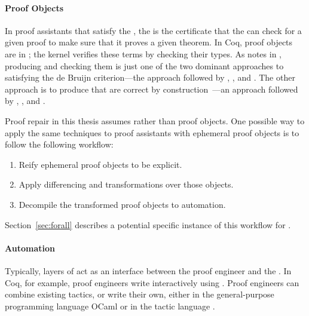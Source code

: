 \paragraph{Proof Objects} 
In proof assistants that satisfy the , the  is the certificate that the  can check for
a given proof to make sure that it proves a given theorem.
In Coq, proof objects are  in ; the kernel verifies these terms by checking their types.
As  notes in , producing  and checking them is just one of the two dominant approaches to satisfying 
the de Bruijn criterion---the approach followed by , , and .
The other approach is to produce  that are correct by construction~\cite{Barendregt2013}---an approach followed
by , , and . %

Proof repair in this thesis assumes  rather than  proof objects.
One possible way to apply the same techniques to proof assistants with ephemeral proof objects is to follow the following workflow:

\begin{enumerate}
\item Reify ephemeral proof objects to be explicit.
\item Apply differencing and transformations over those objects.
\item Decompile the transformed proof objects to automation.
\end{enumerate}
Section~\ref{sec:forall} describes a potential specific instance of this workflow for .

\paragraph{Automation} %
Typically, layers of  act as an interface between the proof engineer and the .
In Coq, for example, proof engineers write  interactively using .
Proof engineers can combine existing tactics, or write their own, either in the general-purpose programming language
OCaml or in the tactic language . 

